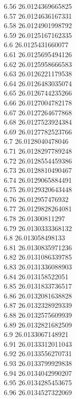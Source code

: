 {6.56	26.0124369665825\\
6.57	26.0124636167331\\
6.58	26.0124901998792\\
6.59	26.0125167162335\\
6.6	26.0125431660077\\
6.61	26.0125695494126\\
6.62	26.0125958666583\\
6.63	26.0126221179538\\
6.64	26.0126483035074\\
6.65	26.0126744235266\\
6.66	26.0127004782178\\
6.67	26.0127264677868\\
6.68	26.0127523924384\\
6.69	26.0127782523766\\
6.7	26.0128040478046\\
6.71	26.0128297789248\\
6.72	26.0128554459386\\
6.73	26.0128810490467\\
6.74	26.0129065884491\\
6.75	26.0129320643448\\
6.76	26.012957476932\\
6.77	26.0129828264081\\
6.78	26.01300811297\\
6.79	26.0130333368132\\
6.8	26.013058498133\\
6.81	26.0130835971236\\
6.82	26.0131086339785\\
6.83	26.0131336088903\\
6.84	26.013158522051\\
6.85	26.0131833736517\\
6.86	26.0132081638828\\
6.87	26.0132328929339\\
6.88	26.0132575609939\\
6.89	26.0132821682509\\
6.9	26.0133067148921\\
6.91	26.0133312011043\\
6.92	26.0133556270731\\
6.93	26.0133799929838\\
6.94	26.0134042990207\\
6.95	26.0134285453675\\
6.96	26.0134527322069\\
}
